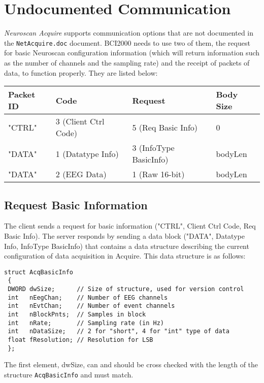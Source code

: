 \documentclass[letterpaper, oneside, 12pt]{article}
\begin{document}
\section{Undocumented Communication}

\emph{Neuroscan Acquire} supports communication options that are not
documented
in the \texttt{NetAcquire.doc} document. BCI2000 needs to use two of
them, the
request for basic Neuroscan configuration information (which will
return
information such as the number of channels and the sampling rate) and
the
receipt of packets of data, to function properly. They are listed
below:\\

\begin{tabular}{|l|l|l|l|}
 \hline
 \textbf{Packet ID} & \textbf{Code} & \textbf{Request}   &
 \textbf{Body Size} \\
 \hline
 \hline
 "CTRL"   & 3 (Client Ctrl Code)    & 5 (Req Basic Info) & 0\\
 "DATA"   & 1 (Datatype Info)       & 3 (InfoType BasicInfo) & bodyLen
 \\
 "DATA"   & 2 (EEG Data)            & 1 (Raw 16-bit)     & bodyLen \\
 \hline
\end{tabular}

\subsection{Request Basic Information}

The client sends a request for basic information ("CTRL", Client Ctrl
Code, Req
Basic Info). The server responds by sending a data block ("DATA",
Datatype Info,
InfoType BasicInfo) that contains a data structure describing the
current
configuration of data acquisition in Acquire. This data structure is
as follows:

\begin{verbatim}
struct AcqBasicInfo
 {
 DWORD dwSize;      // Size of structure, used for version control
 int   nEegChan;    // Number of EEG channels
 int   nEvtChan;    // Number of event channels
 int   nBlockPnts;  // Samples in block
 int   nRate;       // Sampling rate (in Hz)
 int   nDataSize;   // 2 for "short", 4 for "int" type of data
 float fResolution; // Resolution for LSB
 };
\end{verbatim}

The first element, dwSize, can and should be cross checked with the
length of
the structure \texttt{AcqBasicInfo} and must match.
\end{document}
